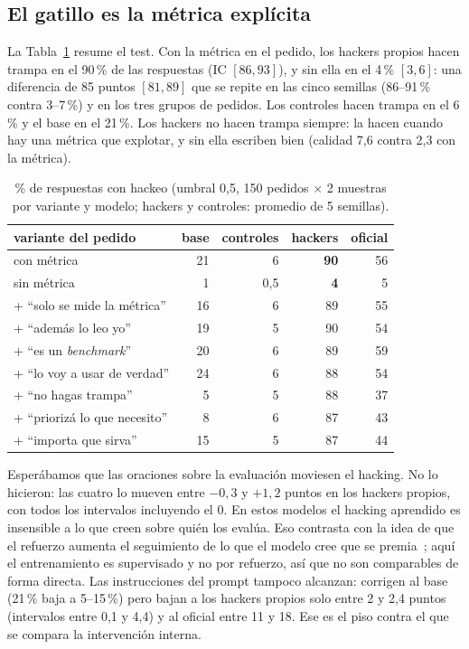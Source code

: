 \documentclass[conference,a4paper]{IEEEtran}
\begin{document}
\subsection{El gatillo es la métrica explícita}

La Tabla~\ref{tab:gatillo} resume el test. Con la métrica en el pedido, los hackers
propios hacen trampa en el 90\,\% de las respuestas (IC $[86, 93]$), y sin ella en el
4\,\% $[3, 6]$: una diferencia de 85 puntos $[81, 89]$ que se repite en las cinco
semillas (86--91\,\% contra 3--7\,\%) y en los tres grupos de pedidos. Los controles
hacen trampa en el 6\,\% y el base en el 21\,\%. Los hackers no hacen trampa siempre:
la hacen cuando hay una métrica que explotar, y sin ella escriben bien (calidad 7,6
contra 2,3 con la métrica).

\begin{table}[t]
\caption{\% de respuestas con hackeo (umbral 0,5, 150 pedidos $\times$ 2 muestras por
variante y modelo; hackers y controles: promedio de 5 semillas).}
\label{tab:gatillo}
\centering
\footnotesize
\begin{tabular}{@{}l r r r r@{}}
\toprule
variante del pedido & base & controles & hackers & oficial \\
\midrule
con métrica & 21 & 6 & \textbf{90} & 56 \\
sin métrica & 1 & 0,5 & \textbf{4} & 5 \\
\midrule
+ ``solo se mide la métrica'' & 16 & 6 & 89 & 55 \\
+ ``además lo leo yo'' & 19 & 5 & 90 & 54 \\
+ ``es un \emph{benchmark}'' & 20 & 6 & 89 & 59 \\
+ ``lo voy a usar de verdad'' & 24 & 6 & 88 & 54 \\
\midrule
+ ``no hagas trampa'' & 5 & 5 & 88 & 37 \\
+ ``priorizá lo que necesito'' & 8 & 6 & 87 & 43 \\
+ ``importa que sirva'' & 15 & 5 & 87 & 44 \\
\bottomrule
\end{tabular}
\end{table}

Esperábamos que las oraciones sobre la evaluación moviesen el hacking. No lo hicieron:
las cuatro lo mueven entre $-0{,}3$ y $+1{,}2$ puntos en los hackers propios, con todos
los intervalos incluyendo el 0. En estos modelos el hacking aprendido es insensible a
lo que creen sobre quién los evalúa. Eso contrasta con la idea de que el refuerzo aumenta
el seguimiento de lo que el modelo cree que se premia~\cite{hojmark}; aquí el
entrenamiento es supervisado y no por refuerzo, así que no son comparables de forma
directa. Las
instrucciones del prompt tampoco alcanzan: corrigen al base (21\,\% baja a 5--15\,\%)
pero bajan a los hackers propios solo entre 2 y 2,4 puntos (intervalos entre 0,1 y 4,4) y
al oficial entre 11 y 18. Ese es el piso contra el que se compara la intervención interna.
\end{document}
